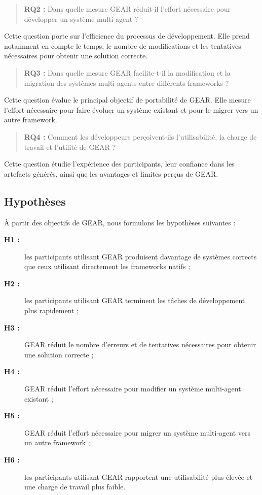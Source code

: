 \begin{quote}
\textbf{RQ2 :} Dans quelle mesure GEAR réduit-il l'effort nécessaire
pour développer un système multi-agent ?
\end{quote}

Cette question porte sur l'efficience du processus de développement.
Elle prend notamment en compte le temps, le nombre de modifications et
les tentatives nécessaires pour obtenir une solution correcte.

\begin{quote}
\textbf{RQ3 :} Dans quelle mesure GEAR facilite-t-il la modification et
la migration des systèmes multi-agents entre différents frameworks ?
\end{quote}

Cette question évalue le principal objectif de portabilité de GEAR. Elle
mesure l'effort nécessaire pour faire évoluer un système existant et
pour le migrer vers un autre framework.

\begin{quote}
\textbf{RQ4 :} Comment les développeurs perçoivent-ils l'utilisabilité,
la charge de travail et l'utilité de GEAR ?
\end{quote}

Cette question étudie l'expérience des participants, leur confiance
dans les artefacts générés, ainsi que les avantages et limites perçus
de GEAR.


\subsection{Hypothèses}
\label{subsec:hypotheses-participants}

À partir des objectifs de GEAR, nous formulons les hypothèses suivantes :

\begin{description}
    \item[\textbf{H1 :}]
    les participants utilisant GEAR produisent davantage de systèmes
    corrects que ceux utilisant directement les frameworks natifs ;

    \item[\textbf{H2 :}]
    les participants utilisant GEAR terminent les tâches de
    développement plus rapidement ;

    \item[\textbf{H3 :}]
    GEAR réduit le nombre d'erreurs et de tentatives nécessaires pour
    obtenir une solution correcte ;

    \item[\textbf{H4 :}]
    GEAR réduit l'effort nécessaire pour modifier un système
    multi-agent existant ;

    \item[\textbf{H5 :}]
    GEAR réduit l'effort nécessaire pour migrer un système multi-agent
    vers un autre framework ;

    \item[\textbf{H6 :}]
    les participants utilisant GEAR rapportent une utilisabilité plus
    élevée et une charge de travail plus faible.
\end{description}


